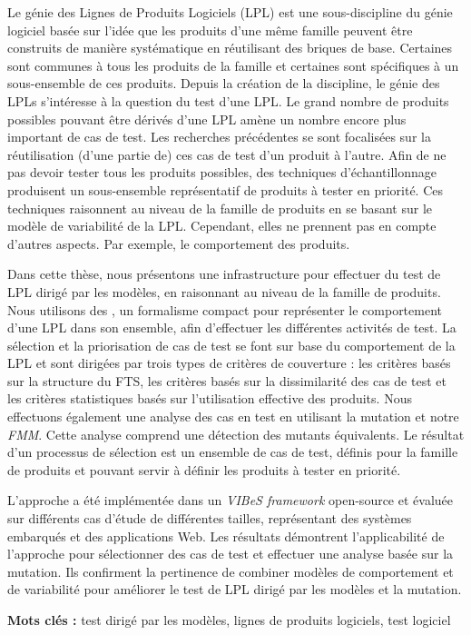 
Le génie des Lignes de Produits Logiciels (LPL) est une sous-discipline du génie logiciel basée sur l'idée que les produits d'une même famille peuvent être construits de manière systématique en réutilisant des briques de base. Certaines sont communes à tous les produits de la famille et certaines sont spécifiques à un sous-ensemble de ces produits. Depuis la création de la discipline, le génie des LPLs s'intéresse à la question du test d'une LPL. Le grand nombre de produits possibles pouvant être dérivés d'une LPL amène un nombre encore plus important de cas de test. Les recherches précédentes se sont focalisées sur la réutilisation (d'une partie de) ces cas de test d'un produit à l'autre. Afin de ne pas devoir tester tous les produits possibles, des techniques d'échantillonnage produisent un sous-ensemble représentatif de produits à tester en priorité. Ces techniques raisonnent au niveau de la famille de produits en se basant sur le modèle de variabilité de la LPL. Cependant, elles ne prennent pas en compte d'autres aspects. Par exemple, le comportement des produits.

Dans cette thèse, nous présentons une infrastructure pour effectuer du test de LPL dirigé par les modèles, en raisonnant au niveau de la famille de produits. Nous utilisons des \textit{}, un formalisme compact pour représenter le comportement d'une LPL dans son ensemble, afin d'effectuer les différentes activités de test. La sélection et la priorisation de cas de test se font sur base du comportement de la LPL et sont dirigées par trois types de critères de couverture : les critères basés sur la structure du FTS, les critères basés sur la dissimilarité des cas de test et les critères statistiques basés sur l'utilisation effective des produits.
Nous effectuons également une analyse des cas en test en utilisant la mutation et notre \textit{\acrfull{FMM}}. Cette analyse comprend une détection des mutants équivalents. 
Le résultat d'un processus de sélection est un ensemble de cas de test, définis pour la famille de produits et pouvant servir à définir les produits à tester en priorité.

L'approche a été implémentée dans un \textit{\acrfull{VIBeS} framework} open-source et évaluée sur différents cas d'étude de différentes tailles, représentant des systèmes embarqués et des applications Web. Les résultats démontrent l'applicabilité de l'approche pour sélectionner des cas de test et effectuer une analyse basée sur la mutation. Ils confirment la pertinence de combiner modèles de comportement et de variabilité pour améliorer le test de LPL dirigé par les modèles et la mutation.

\textbf{Mots clés :} test dirigé par les modèles, lignes de produits logiciels, test logiciel
